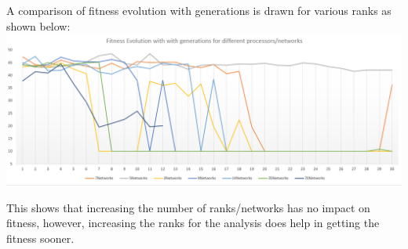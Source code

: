 \documentclass[]{article}
\begin{document}
A comparison of fitness evolution with generations is drawn for various
ranks as shown below:
\includegraphics{./Images/Multiple-deme/fitnessEvolRanks.PNG}

This shows that increasing the number of ranks/networks has no impact on
fitness, however, increasing the ranks for the analysis does help in
getting the fitness sooner.
\end{document}
